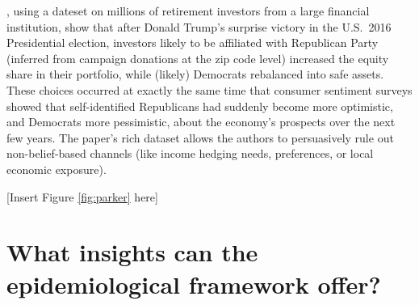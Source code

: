     \href{https://github.com/iworld1991/EpiExp/blob/master/Literature/meeuwis2018belief.pdf}{\cite{meeuwis2018belief}}, using a dateset on millions of retirement investors from a large financial institution, show that after Donald Trump's surprise victory in the U.S.\ 2016 Presidential election, investors likely to be affiliated with Republican Party (inferred from  campaign donations at the zip code level) increased the equity share in their portfolio, while (likely) Democrats rebalanced into safe assets. These choices occurred at exactly the same time that consumer sentiment surveys showed that self-identified Republicans had suddenly become more optimistic, and Democrats more pessimistic, about the economy's prospects over the next few years.  The paper's rich dataset allows the authors to persuasively rule out non-belief-based channels (like income hedging needs, preferences, or local economic exposure). %


\centerline{    [Insert Figure \ref{fig:parker} here]}




\section{What insights can the epidemiological framework
  offer?}\label{what-insights-can-the-epidemiological-framework-offer}

